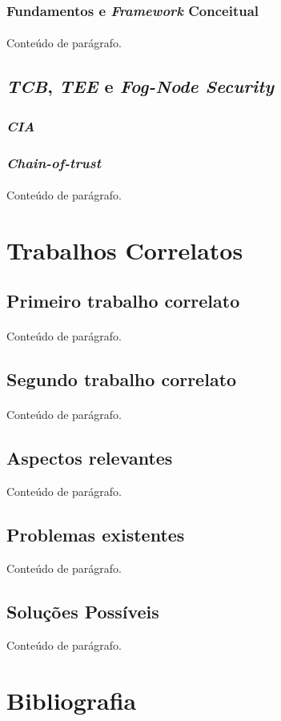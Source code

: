\documentclass[12pt]{article}
\begin{document}
\subsubsection{Fundamentos e \textit{Framework} Conceitual}
\paragraph{}
Conteúdo de parágrafo.

\subsection{\textit{TCB}, \textit{TEE} e \textit{Fog-Node Security}}
\subsubsection{\textit{CIA}}
\subsubsection{\textit{Chain-of-trust}}
\paragraph{}
Conteúdo de parágrafo.

\section{Trabalhos Correlatos}
\subsection{Primeiro trabalho correlato}
\paragraph{}
Conteúdo de parágrafo.

\subsection{Segundo trabalho correlato}
\paragraph{}
Conteúdo de parágrafo.

\subsection{Aspectos relevantes}
Conteúdo de parágrafo.

\subsection{Problemas existentes}
Conteúdo de parágrafo.

\subsection{Soluções Possíveis}
Conteúdo de parágrafo.

\newpage
\section{Bibliografia}


\end{document}
